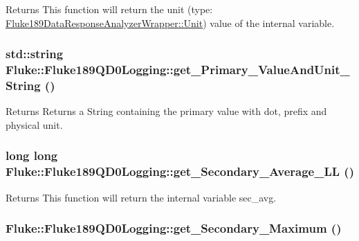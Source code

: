 \label{classFluke_1_1Fluke189QD0Logging_a864f0f60f6995d5d035163caf0651565}
\begin{DoxyReturn}{Returns}
This function will return the unit (type: \hyperlink{classFluke_1_1Fluke189DataResponseAnalyzerWrapper_ab8e5f2306e4d2ad3d741d273793aaed1}{Fluke189DataResponseAnalyzerWrapper::Unit}) value of the internal variable. 
\end{DoxyReturn}
\hypertarget{classFluke_1_1Fluke189QD0Logging_a1ab6475394ca111e1afcd044d4f278e7}{
\subsubsection[{get\_\-Primary\_\-ValueAndUnit\_\-String}]{\setlength{\rightskip}{0pt plus 5cm}std::string Fluke::Fluke189QD0Logging::get\_\-Primary\_\-ValueAndUnit\_\-String ()}}
\label{classFluke_1_1Fluke189QD0Logging_a1ab6475394ca111e1afcd044d4f278e7}
\begin{DoxyReturn}{Returns}
Returns a String containing the primary value with dot, prefix and physical unit. 
\end{DoxyReturn}
\hypertarget{classFluke_1_1Fluke189QD0Logging_a1f33bcc2d2342018f0a1ef5b4ec3caa0}{
\subsubsection[{get\_\-Secondary\_\-Average\_\-LL}]{\setlength{\rightskip}{0pt plus 5cm}long long Fluke::Fluke189QD0Logging::get\_\-Secondary\_\-Average\_\-LL ()}}
\label{classFluke_1_1Fluke189QD0Logging_a1f33bcc2d2342018f0a1ef5b4ec3caa0}
\begin{DoxyReturn}{Returns}
This function will return the internal variable sec\_\-avg. 
\end{DoxyReturn}
\hypertarget{classFluke_1_1Fluke189QD0Logging_a368a2503ede00bd9ef45937fc76278ea}{
\subsubsection[{get\_\-Secondary\_\-Maximum}]{ Fluke::Fluke189QD0Logging::get\_\-Secondary\_\-Maximum ()}}
